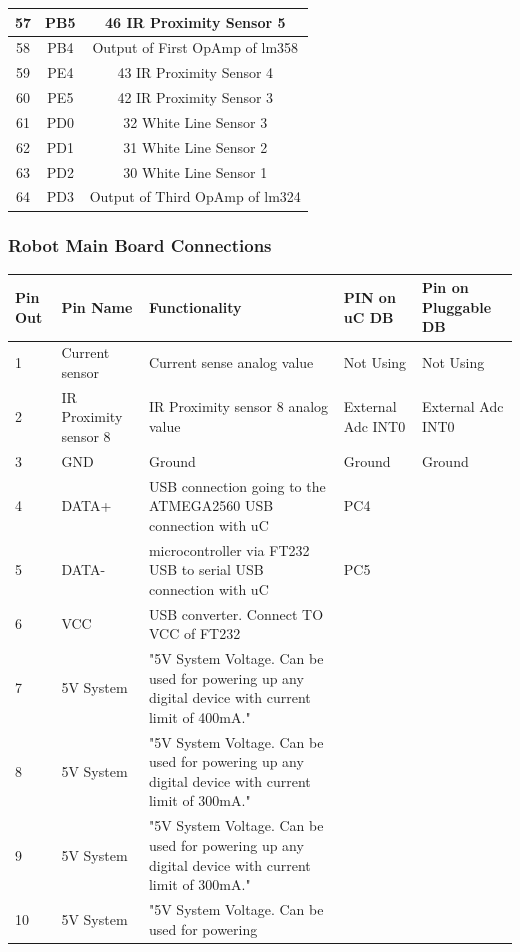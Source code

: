 \documentclass[a4paper,10pt,oneside]{article}
\begin{document}
{\begin{longtable}{|c|c|c|}
				57 &	PB5	 &	46 IR Proximity Sensor 5\\ \hline
				58 &	PB4	 &	Output of First OpAmp of lm358\\ \hline
				59 &	PE4	 &	43 IR Proximity Sensor 4\\ \hline
				60 &	PE5	 &	42 IR Proximity Sensor 3\\ \hline
				61 &	PD0	 &	32 White Line Sensor 3\\ \hline
				62 &	PD1	 &	31 White Line Sensor 2\\ \hline
				63 &	PD2	 &	30 White Line Sensor 1\\ \hline
				64 &	PD3	 &	Output of Third OpAmp of lm324\\ \hline
			\end{longtable}
		\subsubsection{\Large\textbf{Robot Main Board Connections}}
			\begin{longtable}{|p{}|p{}|p{}|p{.1\textwidth}|p{}|}\hline
				Pin Out&	Pin Name&	Functionality&	PIN on uC DB& Pin on Pluggable DB\\ \hline
				1&	Current sensor&	Current sense analog value&	Not Using & Not Using\\ \hline
				2&	IR Proximity sensor 8&	IR Proximity sensor 8 analog value&	External Adc INT0&	External Adc INT0\\ \hline
				3&	GND&	Ground	&Ground & Ground\\ \hline
				4&	DATA+&	USB connection going to the ATMEGA2560	USB connection with uC & PC4 & \\ \hline
				5&	DATA-&	microcontroller via FT232 USB to serial	USB connection with uC &PC5 & \\ \hline
				6&	VCC& USB	converter.	Connect TO VCC of FT232& &\\ \hline
				7&	5V System&	"5V System Voltage. Can be used for powering
				up any digital device with current limit of
				400mA."	& &\\ \hline
				8&	5V System&	"5V System Voltage. Can be used for powering
				up any digital device with current limit of
				300mA."	& &\\ \hline
				9&	5V System&	"5V System Voltage. Can be used for powering
				up any digital device with current limit of
				300mA."	& &\\ \hline
				10&	5V System&	"5V System Voltage. Can be used for powering

\end{longtable}}
\end{document}
